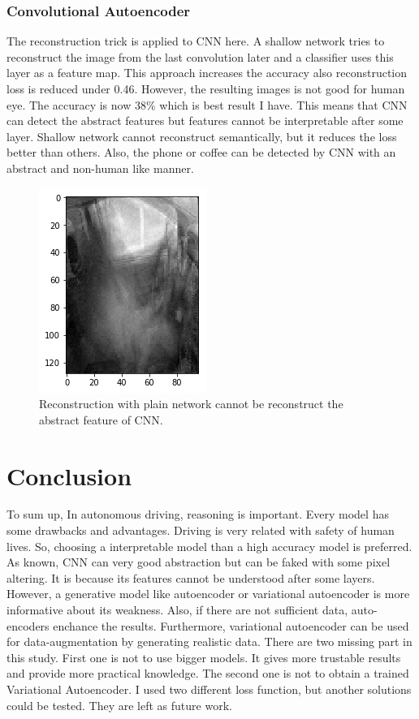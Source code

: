 \documentclass[12pt, letterpaper]{article}
\begin{document}
\subsubsection{Convolutional Autoencoder}
	The reconstruction trick is applied to CNN here. A shallow network tries to reconstruct the image from the last convolution later and a classifier uses this layer as a feature map. This approach increases the accuracy also reconstruction loss is reduced under 0.46. However, the resulting images is not good for human eye. The accuracy is now 38\% which is best result I have. This means that CNN can detect the abstract features but features cannot be interpretable after some layer. Shallow network cannot reconstruct semantically, but it reduces the loss better than others. Also, the phone or coffee can be detected by CNN with an abstract and non-human like manner.
	\begin{figure}[H]
\includegraphics{cae}
    \caption{Reconstruction with plain network cannot be reconstruct the abstract feature of CNN. }
\end{figure}

\section{Conclusion}
	To sum up, In autonomous driving, reasoning is important. Every model has some drawbacks and advantages. Driving is very related with safety of human lives. So, choosing a interpretable model than a high accuracy model is preferred. As known, CNN can very good abstraction but can be faked with some pixel altering. It is because its features cannot be understood after some layers. However, a generative model like autoencoder or variational autoencoder is more informative about its weakness. Also, if there are not sufficient data, auto-encoders enchance the results. Furthermore, variational autoencoder can be used for data-augmentation by generating realistic data.
	There are two missing part in this study. First one is not to use bigger models. It gives more trustable results and provide more practical knowledge. The second one is not to obtain a trained Variational Autoencoder. I used two different loss function, but another solutions could be tested. They are left as future work.
\end{document}
